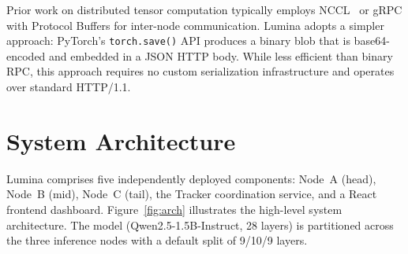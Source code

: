 \documentclass[conference]{IEEEtran}
\begin{document}
Prior work on distributed tensor computation typically employs
NCCL~\cite{jeaugey2017nccl} or gRPC with Protocol Buffers for inter-node
communication. Lumina adopts a simpler approach: PyTorch's \texttt{torch.save()}
API produces a binary blob that is base64-encoded and embedded in a JSON HTTP
body. While less efficient than binary RPC, this approach requires no custom
serialization infrastructure and operates over standard HTTP/1.1.

\section{System Architecture}

Lumina comprises five independently deployed components: Node~A (head),
Node~B (mid), Node~C (tail), the Tracker coordination service, and a React
frontend dashboard. Figure~\ref{fig:arch} illustrates the high-level system
architecture. The model (Qwen2.5-1.5B-Instruct, 28 layers) is partitioned
across the three inference nodes with a default split of 9/10/9 layers.
\end{document}
